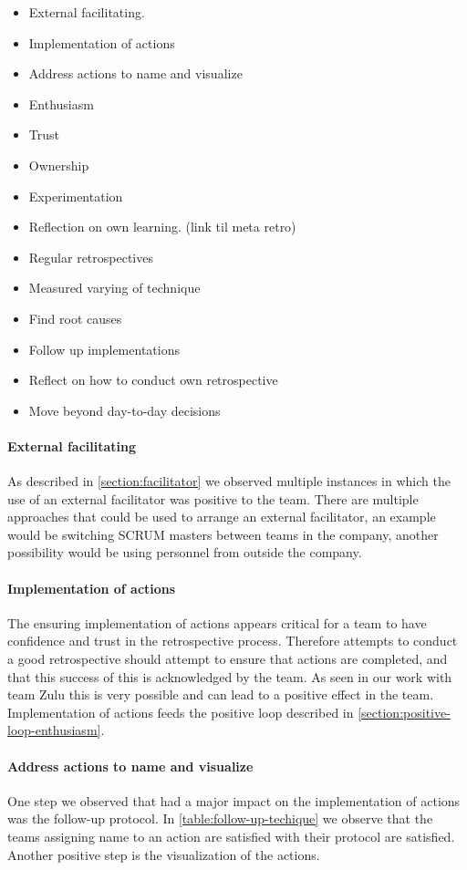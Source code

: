 \begin{itemize}
	\item External facilitating.
	\item Implementation of actions 
	\item Address actions to name and visualize
	\item Enthusiasm
	\item Trust
	\item Ownership
	\item Experimentation
	\item Reflection on own learning. (link til meta retro)
	\item Regular retrospectives
	\item Measured varying of technique
	\item Find root causes
	\item Follow up implementations
	\item Reflect on how to conduct own retrospective
	\item Move beyond day-to-day decisions
\end{itemize}

\paragraph{External facilitating}
As described in \autoref{section:facilitator} we observed multiple instances in which the use of an external facilitator was positive to the team. There are multiple approaches that could be used to arrange an external facilitator, an example would be switching SCRUM masters between teams in the company, another possibility would be using personnel from outside the company.

\paragraph{Implementation of actions}
The ensuring implementation of actions appears critical for a team to have confidence and trust in the retrospective process. Therefore attempts to conduct a good retrospective should attempt to ensure that actions are completed, and that this success of this is acknowledged by the team. As seen in our work with team Zulu this is very possible and can lead to a positive effect in the team. Implementation of actions feeds the positive loop described in \autoref{section:positive-loop-enthusiasm}.

\paragraph{Address actions to name and visualize}
One step we observed that had a major impact on the implementation of actions was the follow-up protocol. In \autoref{table:follow-up-techique} we observe that the teams assigning name to an action are satisfied with their protocol are satisfied. Another positive step is the visualization of the actions.


